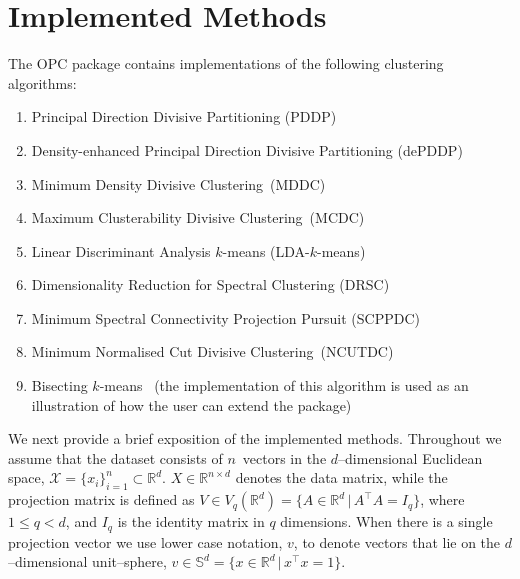 \documentclass{book}
\def\R{\mathbb{R}}
\begin{document}
\chapter{Implemented Methods}

The OPC package contains implementations of the following clustering
algorithms:

\begin{enumerate}

\item Principal Direction Divisive Partitioning (PDDP)~\cite{Boley1998}

\item Density-enhanced Principal Direction Divisive Partitioning (dePDDP)~\cite{TasoulisTP2010}

\item Minimum Density Divisive Clustering~(MDDC)~\cite{PavlidisHT2016}

\item Maximum Clusterability Divisive Clustering~(MCDC)~\cite{HofmeyrP2015}

\item Linear Discriminant Analysis $k$-means (LDA-$k$-means)~\cite{DingL2007}

\item Dimensionality Reduction for Spectral Clustering (DRSC)~\cite{NiuDJ2011,NiuDJ2014}

\item Minimum Spectral Connectivity Projection Pursuit (SCPPDC)~\cite{HofmeyrPE2018}

\item Minimum Normalised Cut Divisive Clustering~(NCUTDC)~\cite{Hofmeyr2017}

\item Bisecting $k$-means~\cite{SteinbachKK2000} (the implementation of this
algorithm is used as an illustration of how the user can extend the package)

\end{enumerate}


\noindent
%
We next provide a brief exposition of the implemented methods.
Throughout we assume that the
dataset consists of $n$~vectors in the $d$--dimensional Euclidean space,
$\mathcal{X} = \{x_i\}_{i=1}^n \subset \R^d$.
%
$X \in \R^{n \times d}$ denotes the data matrix, while 
%
the projection matrix is defined as
%
$V \in V_q(\R^d) = \{A \in \R^d \,|\, A^\top A = I_q\}$, where 
$1\leqslant q<d$, and $I_q$ is the identity matrix in $q$ dimensions.
%
When there is a single projection vector we use lower case notation, $v$,
to denote vectors that lie on the $d$--dimensional unit--sphere,
$v \in \mathbb{S}^{d} = \{ x \in \R^d \,|\, x^\top x=1\}$.
\end{document}
